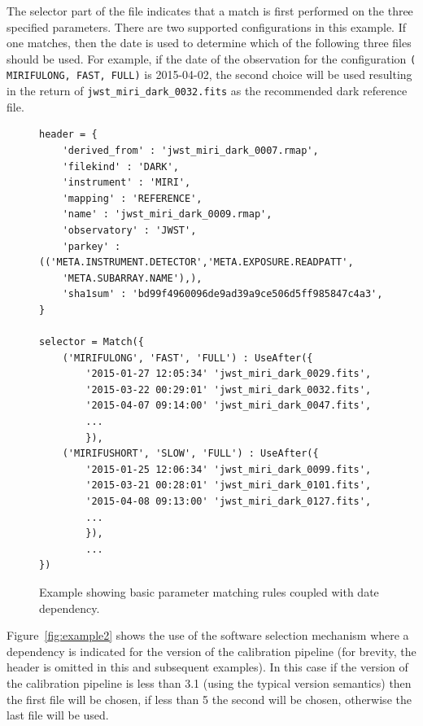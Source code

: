 \documentclass[final,authoryear,5p,times,twocolumn]{elsarticle}
\begin{document}
The selector part of the file indicates that a match is first performed on the 
three specified parameters. There are two supported configurations in this example.
If one matches, then the date is used to determine which of the following three files
should be used.
For example, if the date of the observation for the configuration {\tt (\textquotesingle 
MIRIFULONG\textquotesingle , \textquotesingle FAST\textquotesingle , 
\textquotesingle FULL\textquotesingle )} is 2015-04-02, the second choice 
will be used resulting in the return of {\tt jwst\_miri\_dark\_0032.fits} 
as the recommended dark reference file.


\begin{figure}[ht!]
\begin{verbatim}
header = {
    'derived_from' : 'jwst_miri_dark_0007.rmap',
    'filekind' : 'DARK',
    'instrument' : 'MIRI',
    'mapping' : 'REFERENCE',
    'name' : 'jwst_miri_dark_0009.rmap',
    'observatory' : 'JWST',
    'parkey' : (('META.INSTRUMENT.DETECTOR','META.EXPOSURE.READPATT',
    'META.SUBARRAY.NAME'),),
    'sha1sum' : 'bd99f4960096de9ad39a9ce506d5ff985847c4a3',
}

selector = Match({
    ('MIRIFULONG', 'FAST', 'FULL') : UseAfter({
        '2015-01-27 12:05:34' 'jwst_miri_dark_0029.fits',
        '2015-03-22 00:29:01' 'jwst_miri_dark_0032.fits',
        '2015-04-07 09:14:00' 'jwst_miri_dark_0047.fits',
        ...
        }),
    ('MIRIFUSHORT', 'SLOW', 'FULL') : UseAfter({
        '2015-01-25 12:06:34' 'jwst_miri_dark_0099.fits',
        '2015-03-21 00:28:01' 'jwst_miri_dark_0101.fits',
        '2015-04-08 09:13:00' 'jwst_miri_dark_0127.fits',
        ...
        }),
        ...
})
\end{verbatim}
\caption{Example showing basic parameter matching rules coupled with date dependency.}
\label{fig:example1}
\end{figure}

Figure~\ref{fig:example2} shows the use of the software selection mechanism where a dependency is indicated for the version of the calibration pipeline (for brevity, the header is omitted in this and subsequent examples). In this case if the version of the calibration pipeline is less than 3.1 (using the typical version semantics) then the first file will be chosen, if less than 5 the second will be chosen, otherwise the last file will be used.

\newpage
\end{document}
